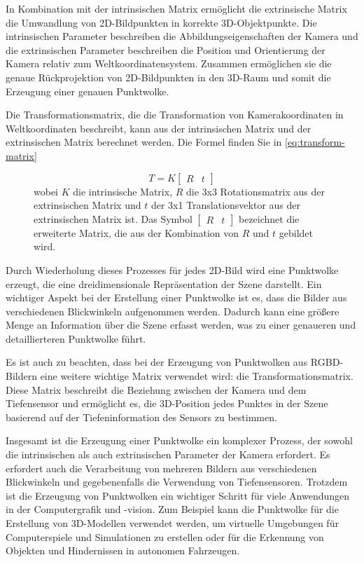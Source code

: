 In Kombination mit der intrinsischen Matrix ermöglicht die extrinsische Matrix die Umwandlung von 2D-Bildpunkten in korrekte 3D-Objektpunkte. Die intrinsischen Parameter beschreiben die Abbildungseigenschaften der Kamera und die extrinsischen Parameter beschreiben die Position und Orientierung der Kamera relativ zum Weltkoordinatensystem. Zusammen ermöglichen sie die genaue Rückprojektion von 2D-Bildpunkten in den 3D-Raum und somit die Erzeugung einer genauen Punktwolke. 

Die Transformationsmatrix, die die Transformation von Kamerakoordinaten in Weltkoordinaten beschreibt, kann aus der intrinsischen Matrix und der extrinsischen Matrix berechnet werden. Die Formel finden Sie in \ref{eq:transform-matrix}

\cite{SWB-470983582}

\begin{figure}
\begin{equation*}
T = K \begin{bmatrix}R & t\end{bmatrix}
\end{equation*}
wobei $K$ die intrinsische Matrix, $R$ die 3x3 Rotationsmatrix aus der extrinsischen Matrix und $t$ der 3x1 Translationsvektor aus der extrinsischen Matrix ist. Das Symbol $\begin{bmatrix}R & t\end{bmatrix}$ bezeichnet die erweiterte Matrix, die aus der Kombination von $R$ und $t$ gebildet wird.
\end{figure}

Durch Wiederholung dieses Prozesses für jedes 2D-Bild wird eine Punktwolke erzeugt, die eine dreidimensionale Repräsentation der Szene darstellt. Ein wichtiger Aspekt bei der Erstellung einer Punktwolke ist es, dass die Bilder aus verschiedenen Blickwinkeln aufgenommen werden. Dadurch kann eine größere Menge an Information über die Szene erfasst werden, was zu einer genaueren und detaillierteren Punktwolke führt.

Es ist auch zu beachten, dass bei der Erzeugung von Punktwolken aus RGBD-Bildern eine weitere wichtige Matrix verwendet wird: die Transformationsmatrix. Diese Matrix beschreibt die Beziehung zwischen der Kamera und dem Tiefensensor und ermöglicht es, die 3D-Position jedes Punktes in der Szene basierend auf der Tiefeninformation des Sensors zu bestimmen.

Insgesamt ist die Erzeugung einer Punktwolke ein komplexer Prozess, der sowohl die intrinsischen als auch extrinsischen Parameter der Kamera erfordert. Es erfordert auch die Verarbeitung von mehreren Bildern aus verschiedenen Blickwinkeln und gegebenenfalls die Verwendung von Tiefensensoren. Trotzdem ist die Erzeugung von Punktwolken ein wichtiger Schritt für viele Anwendungen in der Computergrafik und -vision. Zum Beispiel kann die Punktwolke für die Erstellung von 3D-Modellen verwendet werden, um virtuelle Umgebungen für Computerspiele und Simulationen zu erstellen oder für die Erkennung von Objekten und Hindernissen in autonomen Fahrzeugen.

